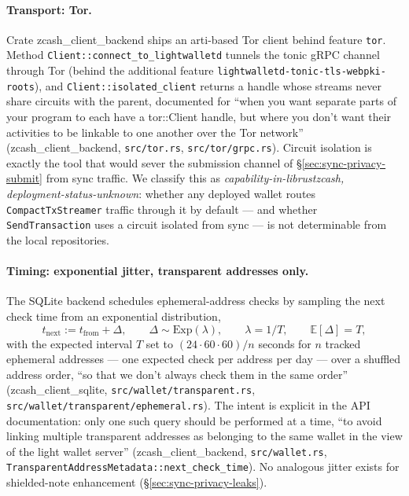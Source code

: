 \documentclass[11pt,a4paper]{article}
\theoremstyle{definition}
\newcommand{\E}{\mathbb{E}}
\begin{document}
\paragraph{Transport: Tor.} Crate \textsf{zcash\_client\_backend} ships an
arti-based Tor client behind feature \texttt{tor}. Method
\texttt{Client::connect\_to\_lightwalletd} tunnels the tonic gRPC channel
through Tor (behind the additional feature
\texttt{lightwalletd-tonic-tls-webpki-roots}), and
\texttt{Client::isolated\_client} returns a handle
whose streams never share circuits with the parent, documented for ``when
you want separate parts of your program to each have a tor::Client handle,
but where you don't want their activities to be linkable to one another
over the Tor network'' (\textsf{zcash\_client\_backend},
\texttt{src/tor.rs}, \texttt{src/tor/grpc.rs}). Circuit isolation is
exactly the tool that would sever the submission channel of
\S\ref{sec:sync-privacy-submit} from sync traffic. We classify this as
\emph{capability-in-librustzcash, deployment-status-unknown}: whether any
deployed wallet routes \texttt{CompactTxStreamer} traffic through it by
default --- and whether \texttt{SendTransaction} uses a circuit isolated
from sync --- is not determinable from the local repositories.

\paragraph{Timing: exponential jitter, transparent addresses only.} The
SQLite backend schedules ephemeral-address checks by sampling the next
check time from an exponential distribution,
\[
  t_{\mathrm{next}} := t_{\mathrm{from}} + \Delta, \qquad
  \Delta \sim \mathrm{Exp}(\lambda), \qquad
  \lambda = 1/T, \qquad
  \E[\Delta] = T,
\]
with the expected interval $T$ set to $(24 \cdot 60 \cdot 60)/n$ seconds
for $n$ tracked ephemeral addresses --- one expected check per address per
day --- over a shuffled address order, ``so that we don't always check them
in the same order'' (\textsf{zcash\_client\_sqlite},
\texttt{src/wallet/transparent.rs},
\texttt{src/wallet/transparent/ephemeral.rs}). The intent is explicit in
the API documentation: only one such query should be performed at a time,
``to avoid linking multiple transparent addresses as belonging to the same
wallet in the view of the light wallet server''
(\textsf{zcash\_client\_backend}, \texttt{src/wallet.rs},
\texttt{TransparentAddressMetadata::next\_check\_time}). No analogous
jitter exists for shielded-note enhancement
(\S\ref{sec:sync-privacy-leaks}).
\end{document}
